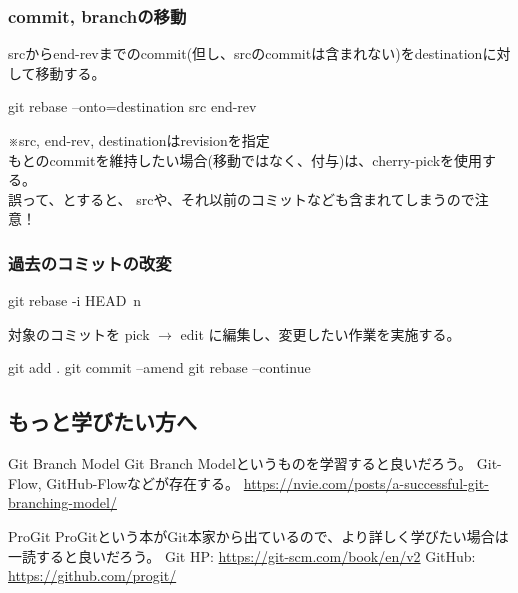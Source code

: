 \documentclass[10pt,a4j,openany,dvipdfmx]{jsarticle}
\begin{document}
\subsubsection{commit, branchの移動} %
\label{ssub:commit_branchの移動}

srcからend-revまでのcommit(但し、srcのcommitは含まれない)をdestinationに対して移動する。
\begin{commandshell}
git rebase --onto=destination src end-rev
\end{commandshell}
※src, end-rev, destinationはrevisionを指定\\

もとのcommitを維持したい場合(移動ではなく、付与)は、cherry-pickを使用する。\\
誤って、とすると、
srcや、それ以前のコミットなども含まれてしまうので注意！

\subsubsection{過去のコミットの改変} %
\label{ssub:過去のコミットの改変}

\begin{commandshell}
git rebase -i HEAD~n
\end{commandshell}
対象のコミットを pick $\rightarrow$ edit に編集し、変更したい作業を実施する。
\begin{commandshell}
git add .
git commit --amend
git rebase --continue
\end{commandshell}


\subsection{もっと学びたい方へ} %
\label{sub:もっと学びたい方へ}


\begin{skybox}{Git Branch Model}
Git Branch Modelというものを学習すると良いだろう。
Git-Flow, GitHub-Flowなどが存在する。
\tcblower
\url{https://nvie.com/posts/a-successful-git-branching-model/}
\end{skybox}

\begin{redbox}{ProGit}
ProGitという本がGit本家から出ているので、より詳しく学びたい場合は一読すると良いだろう。
\tcblower
Git HP: \url{https://git-scm.com/book/en/v2}
GitHub: \url{https://github.com/progit/}
\end{redbox}




\end{document}
